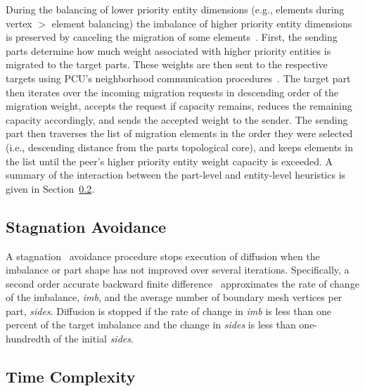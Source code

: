 During the balancing of lower priority entity dimensions (e.g., elements during
vertex $>$ element balancing) the imbalance of higher priority entity dimensions is
preserved by canceling the migration of some elements~\cite{schloegel1997multilevel}.
First, the sending parts determine how much weight associated with higher
priority entities is migrated to the target parts.
These weights are then sent to the respective targets using PCU's neighborhood
communication procedures~\cite{ibanez2016hybrid}.
The target part then iterates over the incoming migration requests in descending
order of the migration weight, accepts the request if capacity remains, reduces
the remaining capacity accordingly, and sends the accepted weight to the sender.
The sending part then traverses the list of migration elements in the order they
were selected (i.e., descending distance from the parts topological core), and keeps
elements in the list until the peer's higher priority entity weight capacity is
exceeded.
A summary of the interaction between the part-level and entity-level heuristics
is given in Section~\ref{sec:complexity}.

\subsection{Stagnation Avoidance}\label{sec:stagnation}
A stagnation~\cite{Zhou2010} avoidance procedure stops execution of diffusion
when the imbalance or part shape has not improved over several iterations.
Specifically, a second order accurate backward finite
difference~\cite{fornberg1988generation} approximates the rate of change of the
imbalance, \textit{imb}, and the average number of boundary mesh
vertices per part, \textit{sides}.
Diffusion is stopped if the rate of change in \textit{imb} is less than one
percent of the target imbalance and the change in \textit{sides} is less than
one-hundredth of the initial \textit{sides}.

\subsection{Time Complexity}\label{sec:complexity}

